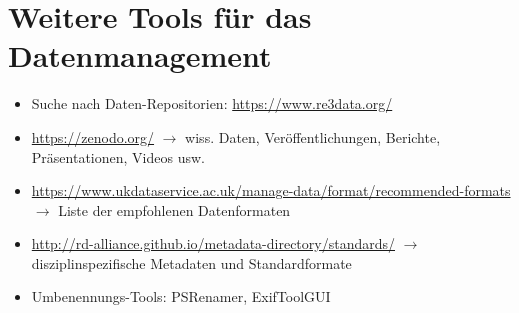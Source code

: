 \section{Weitere Tools für das Datenmanagement}

\begin{itemize}
  \item Suche nach Daten-Repositorien: \url{https://www.re3data.org/}
  \item \url{https://zenodo.org/}\linebreak
  $\rightarrow$ wiss. Daten, Veröffentlichungen, Berichte, Präsentationen, Videos usw.
  \item \url{https://www.ukdataservice.ac.uk/manage-data/format/recommended-formats}\linebreak
          $\rightarrow$ Liste der empfohlenen Datenformaten
  \item \url{http://rd-alliance.github.io/metadata-directory/standards/}\linebreak
        $\rightarrow$ disziplinspezifische Metadaten und Standardformate
  \item Umbenennungs-Tools: PSRenamer, ExifToolGUI
\end{itemize}

